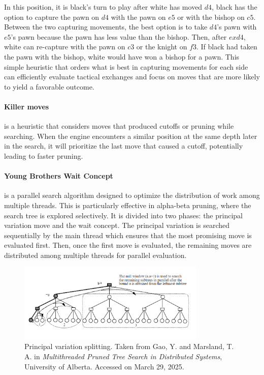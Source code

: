 \noindent In this position, it is black's turn to play after white has moved $d4$, black has the option to capture the pawn on $d4$ with the pawn on $e5$ or with the bishop on $c5$. Between the two capturing movements, the best option is to take $d4$'s pawn with $e5$'s pawn because the pawn has less value than the bishop. Then, after $exd4$, white can re-capture with the pawn on $c3$ or the knight on $f3$. If black had taken the pawn with the bishop, white would have won a bishop for a pawn. This simple heuristic that orders what is best in capturing movements for each side can efficiently evaluate tactical exchanges and focus on moves that are more likely to yield a favorable outcome.

\paragraph{Killer moves} is a heuristic that considers moves that produced cutoffs or pruning while searching. When the engine encounters a similar position at the same depth later in the search, it will prioritize the last move that caused a cutoff, potentially leading to faster pruning.

\paragraph{Young Brothers Wait Concept} is a parallel search algorithm designed to optimize the distribution of work among multiple threads. This is particularly effective in alpha-beta pruning, where the search tree is explored selectively. It is divided into two phases: the principal variation move and the wait concept. The principal variation is searched sequentially by the main thread which ensures that the most promising move is evaluated first. Then, once the first move is evaluated, the remaining moves are distributed among multiple threads for parallel evaluation.

\begin{figure}[H]
    \centering
    \includegraphics[width=0.8\textwidth]{Imagenes/Bitmap/pvsplitting.png}
    \caption{Principal variation splitting. Taken from Gao, Y. and Marsland, T. A. in \textit{Multithreaded Pruned Tree Search in Distributed Systems}, University of Alberta. Accessed on March 29, 2025.}
    \label{fig:pv-splitting}
\end{figure}

